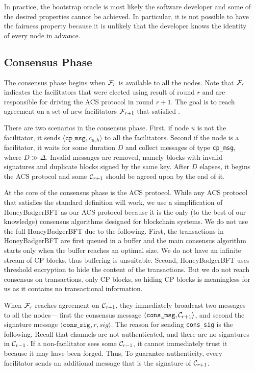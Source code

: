 In practice, the bootstrap oracle is most likely the software developer and some of the desired properties cannot be achieved.
In particular, it is not possible to have the fairness property because it is unlikely that the developer knows the identity of every node in advance.

\subsection{Consensus Phase}
\label{sec:consensus-phase}
The consensus phase begins when $\mathcal{F}_r$ is available to all the nodes.
Note that $\mathcal{F}_r$ indicates the facilitators that were elected using result of round $r$ and are responsible for driving the ACS protocol in round $r + 1$.
The goal is to reach agreement on a set of new facilitators $\mathcal{F}_{r + 1}$ that satisfied .

There are two scenarios in the consensus phase.
First, if node $u$ is not the facilitator, it sends $\langle \texttt{cp\_msg}, c_{u, h} \rangle$ to all the facilitators.
Second if the node is a facilitator, it waits for some duration $D$ and collect messages of type \texttt{cp\_msg}, where $D \gg \Delta$.
Invalid messages are removed, namely blocks with invalid signatures and duplicate blocks signed by the same key.
After $D$ elapses, it begins the ACS protocol and some $\mathcal{C}_{r + 1}$ should be agreed upon by the end of it.

At the core of the consensus phase is the ACS protocol.
While any ACS protocol that satisfies the standard definition will work,
we use a simplification of HoneyBadgerBFT as our ACS protocol
because it is the only (to the best of our knowledge) consensus algorithms designed for blockchain systems.
We do not use the full HoneyBadgerBFT due to the following.
First, the transactions in HoneyBadgerBFT are first queued in a buffer and the main consensus algorithm starts only when the buffer reaches an optimal size.
We do not have an infinite stream of CP blocks, thus buffering is unsuitable.
Second, HoneyBadgerBFT uses threshold encryption to hide the content of the transactions.
But we do not reach consensus on transactions, only CP blocks, so hiding CP blocks is meaningless for us as it contains no transactional information.

When $\mathcal{F}_{r}$ reaches agreement on $\mathcal{C}_{r+1}$,
they immediately broadcast two messages to all the nodes---
first the consensus message $\langle \texttt{cons\_msg}, \mathcal{C}_{r+1} \rangle$,
and second the signature message $\langle \texttt{cons\_sig}, r, sig \rangle$.
The reason for sending \texttt{cons\_sig} is the following.
Recall that channels are not authenticated, 
and there are no signatures in $\mathcal{C}_{r - 1}$.
If a non-facilitator sees some $\mathcal{C}_{r - 1}$, it cannot immediately trust it because it may have been forged.
Thus, To guarantee authenticity, every facilitator sends an additional message that is the signature of $\mathcal{C}_{r + 1}$.

